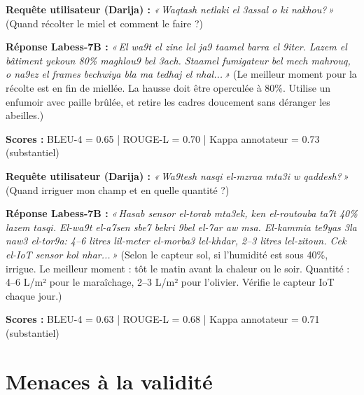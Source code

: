 \vspace{0.5em}

\begin{tcolorbox}[
  colback=blue!5, colframe=blue!50!black,
  title={\textbf{Exemple 2 — Conseil nutrition ruche}},
  fonttitle=\small\bfseries, boxrule=0.8pt
]
\textbf{Requête utilisateur (Darija) :} \textit{«\,Waqtash netlaki el 3assal o ki nakhou?\,»}
(Quand récolter le miel et comment le faire ?)

\textbf{Réponse Labess-7B :} \textit{«\,El wa9t el zine lel ja9 taamel barra el 9iter. Lazem el bâtiment yekoun 80\% maghlou9 bel 3ach. Staamel fumigateur bel mech mahrouq, o na9ez el frames bechwiya bla ma tedhaj el nhal...\,»}
(Le meilleur moment pour la récolte est en fin de miellée. La hausse doit être operculée à 80\%. Utilise un enfumoir avec paille brûlée, et retire les cadres doucement sans déranger les abeilles.)

\textbf{Scores :} BLEU-4 = 0.65 | ROUGE-L = 0.70 | Kappa annotateur = 0.73 (substantiel)
\end{tcolorbox}

\vspace{0.5em}

\begin{tcolorbox}[
  colback=olive!5, colframe=olive!50!black,
  title={\textbf{Exemple 3 — Conseil gestion de l'irrigation}},
  fonttitle=\small\bfseries, boxrule=0.8pt
]
\textbf{Requête utilisateur (Darija) :} \textit{«\,Wa9tesh nasqi el-mzraa mta3i w qaddesh?\,»}
(Quand irriguer mon champ et en quelle quantité ?)

\textbf{Réponse Labess-7B :} \textit{«\,Hasab sensor el-torab mta3ek, ken el-routouba ta7t 40\%
lazem tasqi. El-wa9t el-a7sen sbe7 bekri 9bel el-7ar aw msa. El-kammia te9yas 3la naw3 el-tor9a:
4--6 litres lil-meter el-morba3 lel-khdar, 2--3 litres lel-zitoun. Cek el-IoT sensor kol nhar...\,»}
(Selon le capteur sol, si l'humidité est sous 40\%, irrigue. Le meilleur moment : tôt le matin
avant la chaleur ou le soir. Quantité : 4--6 L/m² pour le maraîchage, 2--3 L/m² pour l'olivier.
Vérifie le capteur IoT chaque jour.)

\textbf{Scores :} BLEU-4 = 0.63 | ROUGE-L = 0.68 | Kappa annotateur = 0.71 (substantiel)
\end{tcolorbox}

\section{Menaces à la validité}

